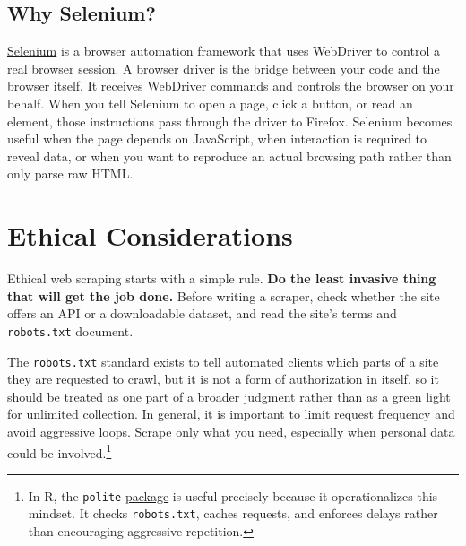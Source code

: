 \documentclass[
  letterpaper,
  DIV=11,
  numbers=noendperiod]{scrreprt}
\newenvironment{Shaded}{\begin{snugshade}}{\end{snugshade}}
\newcommand{\NormalTok}[1]{\textcolor[rgb]{0.00,0.23,0.31}{#1}}
\begin{document}
\subsection{Why Selenium?}\label{why-selenium}

\href{https://www.selenium.dev/}{Selenium} is a browser automation
framework that uses WebDriver to control a real browser session. A
browser driver is the bridge between your code and the browser itself.
It receives WebDriver commands and controls the browser on your behalf.
When you tell Selenium to open a page, click a button, or read an
element, those instructions pass through the driver to Firefox. Selenium
becomes useful when the page depends on JavaScript, when interaction is
required to reveal data, or when you want to reproduce an actual
browsing path rather than only parse raw HTML.

\section{Ethical Considerations}\label{ethical-considerations}

Ethical web scraping starts with a simple rule. \textbf{Do the least
invasive thing that will get the job done.} Before writing a scraper,
check whether the site offers an API or a downloadable dataset, and read
the site's terms and \texttt{robots.txt} document.

\begin{codelisting}

\caption{\label{lst-robots}Minimal example of a robots.txt file}

\centering{

\begin{Shaded}
\begin{Highlighting}[]
\NormalTok{User{-}agent: *}
\NormalTok{Disallow: /admin/}
\NormalTok{Disallow: /private/}
\NormalTok{Allow: /public/}

\NormalTok{Sitemap: https://example.org/sitemap.xml}
\end{Highlighting}
\end{Shaded}

}

\end{codelisting}%

The \texttt{robots.txt} standard exists to tell automated clients which
parts of a site they are requested to crawl, but it is not a form of
authorization in itself, so it should be treated as one part of a
broader judgment rather than as a green light for unlimited collection.
In general, it is important to limit request frequency and avoid
aggressive loops. Scrape only what you need, especially when personal
data could be involved.\footnote{In R, the \texttt{polite}
  \href{https://dmi3kno.github.io/polite/}{package} is useful precisely
  because it operationalizes this mindset. It checks
  \texttt{robots.txt}, caches requests, and enforces delays rather than
  encouraging aggressive repetition.}
\end{document}
